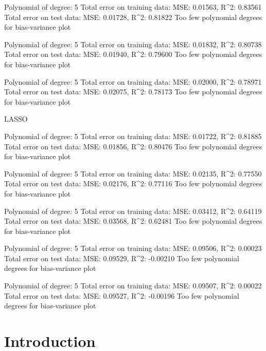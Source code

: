\documentclass[a4paper, twocolumn]{article}
\begin{document}
Polynomial of degree:  5
Total error on training data:
MSE: 0.01563,  R^2: 0.83561
Total error on test data:
MSE: 0.01728,  R^2: 0.81822
Too few polynomial degrees for bias-variance plot

Polynomial of degree:  5
Total error on training data:
MSE: 0.01832,  R^2: 0.80738
Total error on test data:
MSE: 0.01940,  R^2: 0.79600
Too few polynomial degrees for bias-variance plot

Polynomial of degree:  5
Total error on training data:
MSE: 0.02000,  R^2: 0.78971
Total error on test data:
MSE: 0.02075,  R^2: 0.78173
Too few polynomial degrees for bias-variance plot


LASSO

Polynomial of degree:  5
Total error on training data:
MSE: 0.01722,  R^2: 0.81885
Total error on test data:
MSE: 0.01856,  R^2: 0.80476
Too few polynomial degrees for bias-variance plot

Polynomial of degree:  5
Total error on training data:
MSE: 0.02135,  R^2: 0.77550
Total error on test data:
MSE: 0.02176,  R^2: 0.77116
Too few polynomial degrees for bias-variance plot

Polynomial of degree:  5
Total error on training data:
MSE: 0.03412,  R^2: 0.64119
Total error on test data:
MSE: 0.03568,  R^2: 0.62481
Too few polynomial degrees for bias-variance plot

Polynomial of degree:  5
Total error on training data:
MSE: 0.09506,  R^2: 0.00023
Total error on test data:
MSE: 0.09529,  R^2: -0.00210
Too few polynomial degrees for bias-variance plot

Polynomial of degree:  5
Total error on training data:
MSE: 0.09507,  R^2: 0.00022
Total error on test data:
MSE: 0.09527,  R^2: -0.00196
Too few polynomial degrees for bias-variance plot
\fi
\section{Introduction}
\end{document}
